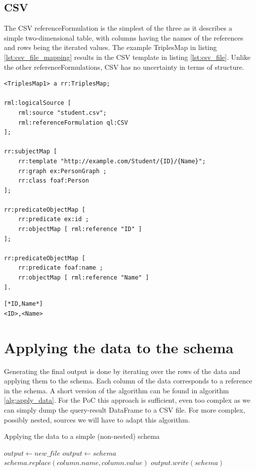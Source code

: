 \subsection{CSV}
\label{subsection:csv}
The CSV referenceFormulation is the simplest of the three as it describes a simple two-dimensional table, with columns having the names of the references and rows being the iterated values. The example TriplesMap in listing \ref{lst:csv_file_mapping} results in the CSV template in listing \ref{lst:csv_file}. Unlike the other referenceFormulations, CSV has no uncertainty in terms of structure.

\begin{lstlisting}[caption={Example mapping for a CSV file}, label={lst:csv_file_mapping}, captionpos=b, basicstyle=\small]
<TriplesMap1> a rr:TriplesMap;

rml:logicalSource [ 
    rml:source "student.csv";
    rml:referenceFormulation ql:CSV
];

rr:subjectMap [ 
    rr:template "http://example.com/Student/{ID}/{Name}";
    rr:graph ex:PersonGraph ;
    rr:class foaf:Person
];

rr:predicateObjectMap [ 
    rr:predicate ex:id ; 
    rr:objectMap [ rml:reference "ID" ]
];

rr:predicateObjectMap [ 
    rr:predicate foaf:name ; 
    rr:objectMap [ rml:reference "Name" ]
].
\end{lstlisting}

\begin{lstlisting}[caption={Example CSV template}, label={lst:csv_file}, captionpos=b, basicstyle=\small]
[*ID,Name*]
<ID>,<Name>
\end{lstlisting}

\section{Applying the data to the schema}
\label{section:applying_data}
Generating the final output is done by iterating over the rows of the data and applying them to the schema. Each column of the data corresponds to a reference in the schema. A short version of the algorithm can be found in algorithm \ref{alg:apply_data}. For the PoC this approach is sufficient, even too complex as we can simply dump the query-result DataFrame to a CSV file. For more complex, possibly nested, sources we will have to adapt this algorithm.

\begin{algorithm}
    \caption{Applying the data to a simple (non-nested) schema}
    \label{alg:apply_data}
    \begin{algorithmic}[1]
        \State $output \gets new\_file$
            \State $output \gets schema$
                \State $schema.replace(column.name, column.value)$
            \EndFor
            \State $output.write(schema)$
        \EndFor
    \end{algorithmic}
\end{algorithm}
